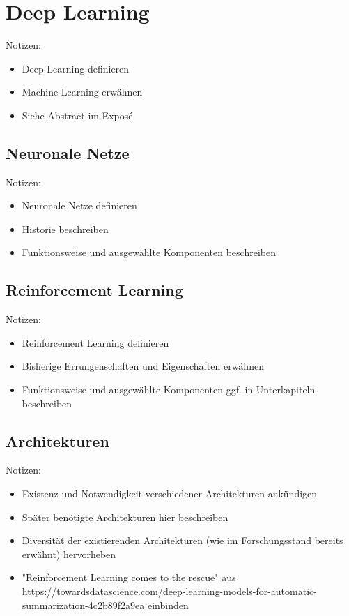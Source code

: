 \chapter{Deep Learning}
\thispagestyle{fancy}
\label{chap:Deep Learning}

Notizen:
\begin{itemize}
	\item Deep Learning definieren
	\item Machine Learning erwähnen
	\item Siehe Abstract im Exposé
\end{itemize}


\section{Neuronale Netze}
Notizen:
\begin{itemize}
	\item Neuronale Netze definieren
	\item Historie beschreiben
	\item Funktionsweise und ausgewählte Komponenten beschreiben
\end{itemize}


\section{Reinforcement Learning}
Notizen:
\begin{itemize}
	\item Reinforcement Learning definieren
	\item Bisherige Errungenschaften und Eigenschaften erwähnen
	\item Funktionsweise und ausgewählte Komponenten ggf. in Unterkapiteln beschreiben
\end{itemize}


\section{Architekturen}
Notizen:
\begin{itemize}
	\item Existenz und Notwendigkeit verschiedener Architekturen ankündigen
	\item Später benötigte Architekturen hier beschreiben
	\item Diversität der existierenden Architekturen (wie im Forschungsstand bereits erwähnt) hervorheben
	\item "Reinforcement Learning comes to the rescue" aus \url{https://towardsdatascience.com/deep-learning-models-for-automatic-summarization-4c2b89f2a9ea} einbinden
\end{itemize}


